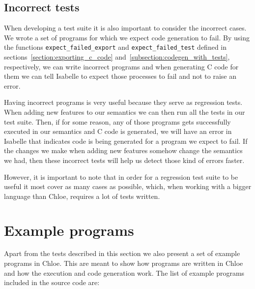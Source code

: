 \subsection{Incorrect tests}

When developing a test suite it is also important to consider the incorrect cases.
We wrote a set of programs for which we expect code generation to fail.
By using the functions \verb|expect_failed_export| and \verb|expect_failed_test| defined in sections~\ref{section:exporting_c_code} and~\ref{subsection:codegen_with_tests}, respectively, we can write incorrect programs and when generating C code for them we can tell Isabelle to expect those processes to fail and not to raise an error.

Having incorrect programs is very useful because they serve as regression tests.
When adding new features to our semantics we can then run all the tests in our test suite.
Then, if for some reason, any of those programs gets successfully executed in our semantics and C code is generated, we will have an error in Isabelle that indicates code is being generated for a program we expect to fail.
If the changes we make when adding new features somehow change the semantics we had, then these incorrect tests will help us detect those kind of errors faster.

However, it is important to note that in order for a regression test suite to be useful it most cover as many cases as possible, which, when working with a bigger language than Chloe, requires a lot of tests written.

\section{Example programs}

Apart from the tests described in this section we also present a set of example programs in Chloe.
This are meant to show how programs are written in Chloe and how the execution and code generation work.
The list of example programs included in the source code are:

